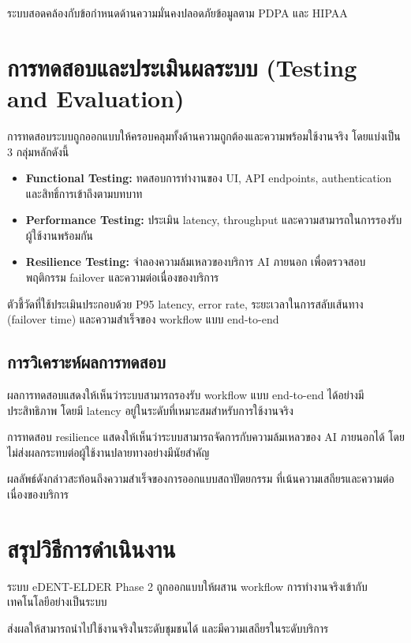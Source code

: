 ระบบสอดคล้องกับข้อกำหนดด้านความมั่นคงปลอดภัยข้อมูลตาม PDPA และ HIPAA

\section{การทดสอบและประเมินผลระบบ (Testing and Evaluation)}

การทดสอบระบบถูกออกแบบให้ครอบคลุมทั้งด้านความถูกต้องและความพร้อมใช้งานจริง
โดยแบ่งเป็น 3 กลุ่มหลักดังนี้

\begin{itemize}
\item \textbf{Functional Testing:}
ทดสอบการทำงานของ UI, API endpoints, authentication และสิทธิ์การเข้าถึงตามบทบาท
\item \textbf{Performance Testing:}
ประเมิน latency, throughput และความสามารถในการรองรับผู้ใช้งานพร้อมกัน
\item \textbf{Resilience Testing:}
จำลองความล้มเหลวของบริการ AI ภายนอก เพื่อตรวจสอบพฤติกรรม failover และความต่อเนื่องของบริการ
\end{itemize}

ตัวชี้วัดที่ใช้ประเมินประกอบด้วย P95 latency, error rate,
ระยะเวลาในการสลับเส้นทาง (failover time) และความสำเร็จของ workflow แบบ end-to-end

\subsection{การวิเคราะห์ผลการทดสอบ}

ผลการทดสอบแสดงให้เห็นว่าระบบสามารถรองรับ workflow แบบ end-to-end ได้อย่างมีประสิทธิภาพ
โดยมี latency อยู่ในระดับที่เหมาะสมสำหรับการใช้งานจริง

การทดสอบ resilience แสดงให้เห็นว่าระบบสามารถจัดการกับความล้มเหลวของ AI ภายนอกได้
โดยไม่ส่งผลกระทบต่อผู้ใช้งานปลายทางอย่างมีนัยสำคัญ

ผลลัพธ์ดังกล่าวสะท้อนถึงความสำเร็จของการออกแบบสถาปัตยกรรม
ที่เน้นความเสถียรและความต่อเนื่องของบริการ

\section{สรุปวิธีการดำเนินงาน}

ระบบ eDENT-ELDER Phase 2
ถูกออกแบบให้ผสาน workflow การทำงานจริงเข้ากับเทคโนโลยีอย่างเป็นระบบ

ส่งผลให้สามารถนำไปใช้งานจริงในระดับชุมชนได้
และมีความเสถียรในระดับบริการ